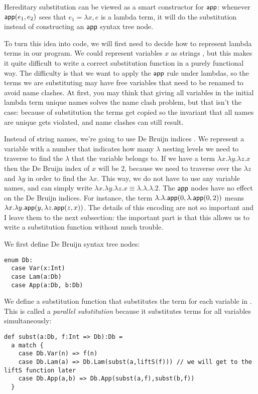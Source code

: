 Hereditary substitution can be viewed as a smart constructor for $\mathsf{app}$: whenever $\mathsf{app}(e_1,e_2)$ sees that $e_1 = \lambda x, e$ is a lambda term, it will do the substitution instead of constructing an $\mathsf{app}$ syntax tree node.

To turn this idea into code, we will first need to decide how to represent lambda terms in our program.
We could represent variables $x$ as strings , but this makes it quite difficult to write a correct substitution function in a purely functional way.
The difficulty is that we want to apply the $\mathsf{app}$ rule under lambdas, so the terms we are substituting may have free variables that need to be renamed to avoid name clashes.
At first, you may think that giving all variables in the initial lambda term unique names solves the name clash problem, but that isn't the case: because of substitution the terms get copied so the invariant that all names are unique gets violated, and name clashes can still result.

Instead of string names, we're going to use De Bruijn indices \cite{BruijnIndex2021}.
We represent a variable with a number that indicates how many $\lambda$ nesting levels we need to traverse to find the $\lambda$ that the variable belongs to.
If we have a term $\lambda x. \lambda y. \lambda z. x$ then the De Bruijn index of $x$ will be $2$, because we need to traverse over the $\lambda z$ and $\lambda y$ in order to find the $\lambda x$.
This way, we do not have to use any variable names, and can simply write $\lambda x. \lambda y. \lambda z. x \equiv \lambda. \lambda. \lambda. 2$.
The $\mathsf{app}$ nodes have no effect on the De Bruijn indices.
For instance, the term $\lambda. \lambda. \mathsf{app}(0,\lambda. \mathsf{app}(0,2))$ means $\lambda x. \lambda y. \mathsf{app}(y, \lambda z. \mathsf{app}(z,x))$.
The details of this encoding are not so important and I leave them to the next subsection: the important part is that this allows us to write a substitution function without much trouble.

We first define De Bruijn syntax tree nodes:
\begin{lstlisting}
enum Db:
  case Var(x:Int)
  case Lam(a:Db)
  case App(a:Db, b:Db)
\end{lstlisting}

We define a substitution function  that substitutes the term  for each variable  in . This is called a \emph{parallel substitution} because it substitutes terms for all variables simultaneously:

\begin{lstlisting}
def subst(a:Db, f:Int => Db):Db =
  a match {
    case Db.Var(n) => f(n)
    case Db.Lam(a) => Db.Lam(subst(a,liftS(f))) // we will get to the liftS function later
    case Db.App(a,b) => Db.App(subst(a,f),subst(b,f))
  }
\end{lstlisting}

